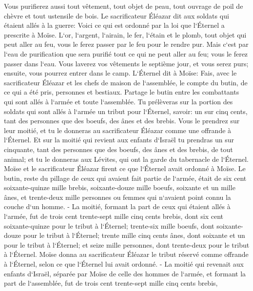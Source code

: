 \verse Vous purifierez aussi tout vêtement, tout objet de peau, tout ouvrage de poil de chèvre et tout ustensile de bois. 
\verse Le sacrificateur Éléazar dit aux soldats qui étaient allés à la guerre: Voici ce qui est ordonné par la loi que l`Éternel a prescrite à Moïse. 
\verse L`or, l`argent, l`airain, le fer, l`étain et le plomb, 
\verse tout objet qui peut aller au feu, vous le ferez passer par le feu pour le rendre pur. Mais c`est par l`eau de purification que sera purifié tout ce qui ne peut aller au feu; vous le ferez passer dans l`eau. 
\verse Vous laverez vos vêtements le septième jour, et vous serez purs; ensuite, vous pourrez entrer dans le camp. 
\verse L`Éternel dit à Moïse: 
\verse Fais, avec le sacrificateur Éléazar et les chefs de maison de l`assemblée, le compte du butin, de ce qui a été pris, personnes et bestiaux. 
\verse Partage le butin entre les combattants qui sont allés à l`armée et toute l`assemblée. 
\verse Tu prélèveras sur la portion des soldats qui sont allés à l`armée un tribut pour l`Éternel, savoir: un sur cinq cents, tant des personnes que des boeufs, des ânes et des brebis. 
\verse Vous le prendrez sur leur moitié, et tu le donneras au sacrificateur Éléazar comme une offrande à l`Éternel. 
\verse Et sur la moitié qui revient aux enfants d`Israël tu prendras un sur cinquante, tant des personnes que des boeufs, des ânes et des brebis, de tout animal; et tu le donneras aux Lévites, qui ont la garde du tabernacle de l`Éternel. 
\verse Moïse et le sacrificateur Éléazar firent ce que l`Éternel avait ordonné à Moïse. 
\verse Le butin, reste du pillage de ceux qui avaient fait partie de l`armée, était de six cent soixante-quinze mille brebis, 
\verse soixante-douze mille boeufs, 
\verse soixante et un mille ânes, 
\verse et trente-deux mille personnes ou femmes qui n`avaient point connu la couche d`un homme. - 
\verse La moitié, formant la part de ceux qui étaient allés à l`armée, fut de trois cent trente-sept mille cinq cents brebis, 
\verse dont six cent soixante-quinze pour le tribut à l`Éternel; 
\verse trente-six mille boeufs, dont soixante-douze pour le tribut à l`Éternel; 
\verse trente mille cinq cents ânes, dont soixante et un pour le tribut à l`Éternel; 
\verse et seize mille personnes, dont trente-deux pour le tribut à l`Éternel. 
\verse Moïse donna au sacrificateur Éléazar le tribut réservé comme offrande à l`Éternel, selon ce que l`Éternel lui avait ordonné. - 
\verse La moitié qui revenait aux enfants d`Israël, séparée par Moïse de celle des hommes de l`armée, 
\verse et formant la part de l`assemblée, fut de trois cent trente-sept mille cinq cents brebis, 
